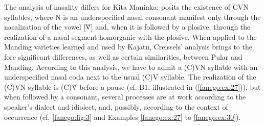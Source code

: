 \documentclass[output=paper]{langscibook}
\begin{document}
The analysis of nasality differs for Kita Maninka: \citet[16–17]{creissels_malinke_2009} posits the existence of CVN syllables, where N is an underspecified nasal consonant manifest only through the nasalization of the vowel [Ṽ] and, when it is followed by a plosive, through the realization of a nasal segment homorganic with the plosive. When applied to the Manding varieties learned and used by Kajatu, Creissels’ analysis brings to the fore significant differences, as well as certain similarities, between Pular and Manding. According to this analysis, we have to admit a (C)VN syllable with an underspecified nasal coda next to the usual (C)V syllable. The realization of the (C)VN syllable is (C)Ṽ before a pause (cf. B1, illustrated in (\ref{fanego:ex:27})), but when followed by a consonant, several processes are at work according to the speaker’s dialect and idiolect, and, possibly, according to the context of occurrence (cf. \autoref{fanego:fig:3} and Examples \ref{fanego:ex:27} to \ref{fanego:ex:30}).
\end{document}
